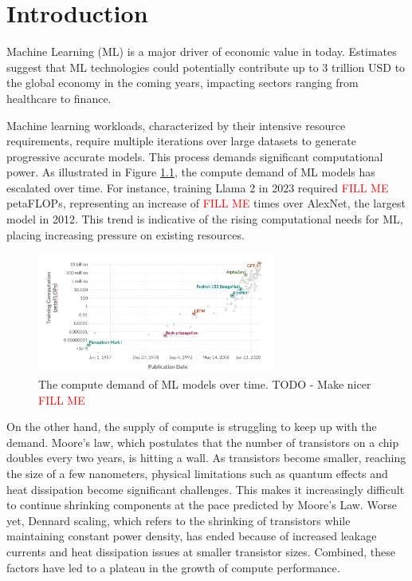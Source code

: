 \chapter{Introduction}
\label{ch_intro}


\newcommand{\fillme}{\textcolor{red}{FILL ME}}

Machine Learning (ML) is a major driver of economic value in today. Estimates suggest that ML technologies could potentially contribute up to 3 trillion USD \cite{something} to the global economy in the coming years, impacting sectors ranging from healthcare to finance. 

Machine learning workloads, characterized by their intensive resource requirements, require multiple iterations over large datasets to generate progressive accurate models. This process demands significant computational power. As illustrated in Figure \ref{fig:compute_demand}, the compute demand of ML models has escalated over time. For instance, training Llama 2 in 2023 required \fillme{} petaFLOPs, representing an increase of \fillme{} times over AlexNet, the largest model in 2012. This trend is indicative of the rising computational needs for ML, placing increasing pressure on existing resources.

\begin{figure}
    \centering
    \includegraphics[width=0.7\textwidth]{intro/figures/MLCompute.png}
    \caption{The compute demand of ML models over time. TODO - Make nicer \fillme{}}
    \label{fig:compute_demand}
\end{figure}

On the other hand, the supply of compute is struggling to keep up with the demand. Moore's law, which postulates that the number of transistors on a chip doubles every two years, is hitting a wall. As transistors become smaller, reaching the size of a few nanometers, physical limitations such as quantum effects and heat dissipation become significant challenges. This makes it increasingly difficult to continue shrinking components at the pace predicted by Moore's Law. Worse yet, Dennard scaling, which refers to the shrinking of transistors while maintaining constant power density, has ended because of increased leakage currents and heat dissipation issues at smaller transistor sizes. Combined, these factors have led to a plateau in the growth of compute performance.

